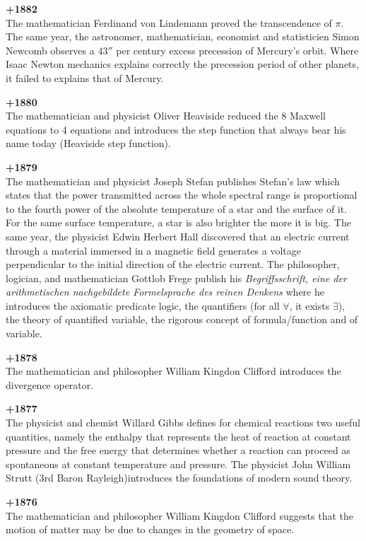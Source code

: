 \textbf{+1882}\\
The mathematician Ferdinand von Lindemann proved the transcendence of $\pi$. The same year, the astronomer, mathematician, economist and statisticien Simon Newcomb observes a $43''$ per century excess precession of Mercury's orbit. Where Isaac Newton mechanics explains correctly the precession period of other planets, it failed to explains that of Mercury.

\textbf{+1880}\\
The mathematician and physicist Oliver Heaviside reduced the $8$ Maxwell equations to 4 equations and introduces the step function that always bear his name today (Heaviside step function).

\textbf{+1879}\\
The mathematician and physicist Joseph Stefan publishes Stefan's law which states that the power transmitted across the whole spectral range is proportional to the fourth power of the absolute temperature of a star and the surface of it. For the same surface temperature, a star is also brighter the more it is big. The same year, the physicist Edwin Herbert Hall discovered that an electric current through a material immersed in a magnetic field generates a voltage perpendicular to the initial direction of the electric current. The philosopher, logician, and mathematician Gottlob Frege publish his \textit{Begriffsschrift, eine der arithmetischen nachgebildete Formelsprache des reinen Denkens} where he introduces the axiomatic predicate logic, the quantifiers (for all $\forall$, it exists $\exists$), the theory of quantified variable, the rigorous concept of formula/function and of variable.

\textbf{+1878}\\
The mathematician and philosopher William Kingdon Clifford introduces the divergence operator.

\textbf{+1877}\\
The physicist and chemist Willard Gibbs defines for chemical reactions two useful quantities, namely the enthalpy that represents the heat of reaction at constant pressure and the free energy that determines whether a reaction can proceed as spontaneous at constant temperature and pressure. The physicist John William Strutt (3rd Baron Rayleigh)introduces the foundations of modern sound theory. 

\textbf{+1876}\\
The mathematician and philosopher William Kingdon Clifford suggests that the motion of matter may be due to changes in the geometry of space.

